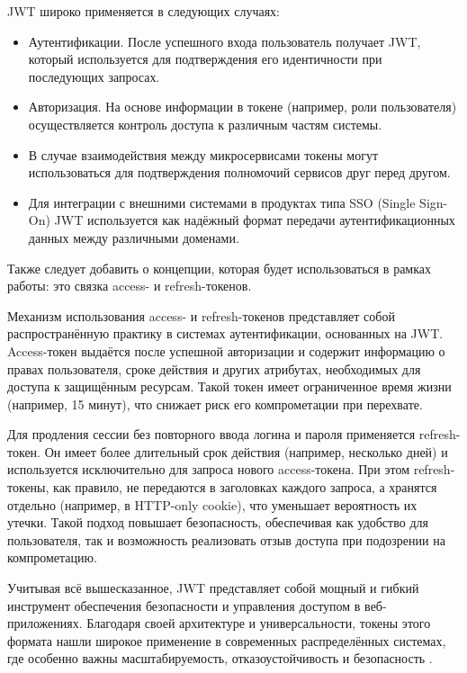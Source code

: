 \documentclass[diploma]{SCWorks}
\begin{document}
JWT широко применяется в следующих случаях:

\begin{itemize}
    \item Аутентификации. После успешного входа пользователь получает JWT, 
    который используется для подтверждения его идентичности при последующих 
    запросах.
    \item Авторизация. На основе информации в токене (например, роли 
    пользователя) осуществляется контроль доступа к различным частям системы.
    \item В случае взаимодействия между микросервисами токены могут 
    использоваться для подтверждения полномочий сервисов друг перед другом.
    \item Для интеграции с внешними системами в продуктах типа SSO 
    (Single Sign-On) JWT используется как надёжный формат передачи 
    аутентификационных данных между различными доменами.
\end{itemize}

Также следует добавить о концепции, которая будет использоваться в рамках 
работы: это связка access- и refresh-токенов.

Механизм использования access- и refresh-токенов 
представляет собой распространённую практику в системах аутентификации, 
основанных на JWT. Access-токен выдаётся после успешной авторизации 
и содержит информацию о правах пользователя, сроке действия и других 
атрибутах, необходимых для доступа к защищённым ресурсам. Такой токен имеет 
ограниченное время жизни (например, 15 минут), что снижает риск его 
компрометации при перехвате.

Для продления сессии без повторного ввода логина и пароля применяется 
refresh-токен. Он имеет более длительный срок действия (например, 
несколько дней) и используется исключительно для запроса нового 
access-токена. При этом refresh-токены, как правило, не 
передаются в заголовках каждого запроса, а хранятся отдельно (например, 
в HTTP-only cookie), что уменьшает вероятность их утечки. Такой подход 
повышает безопасность, обеспечивая как удобство для пользователя, так и 
возможность реализовать отзыв доступа при подозрении на компрометацию.

Учитывая всё вышесказанное, JWT представляет собой мощный и гибкий 
инструмент обеспечения безопасности и управления доступом в веб-приложениях. 
Благодаря своей архитектуре и универсальности, токены этого формата нашли 
широкое применение в современных распределённых системах, где особенно важны 
масштабируемость, отказоустойчивость и безопасность \cite{jwt,oauth2}. 
\end{document}
